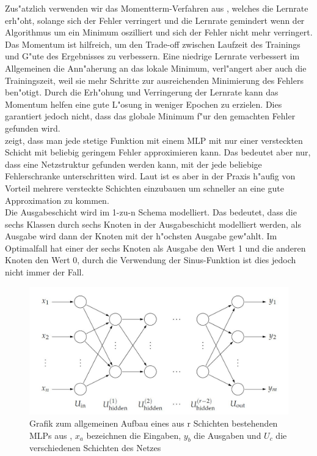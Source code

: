 Zus"atzlich verwenden wir das Momentterm-Verfahren aus \cite{rumelhart1988learning}, welches die Lernrate erh"oht, solange sich der Fehler verringert und die Lernrate gemindert wenn der Algorithmus um ein Minimum oszilliert und sich der Fehler nicht mehr verringert. Das Momentum ist hilfreich, um den Trade-off zwischen Laufzeit des Trainings und G"ute des Ergebnisses zu verbessern. Eine niedrige Lernrate verbessert im Allgemeinen die Ann"aherung an das lokale Minimum, verl"angert aber auch die Trainingszeit, weil sie mehr Schritte zur ausreichenden Minimierung des Fehlers ben"otigt. Durch die Erh"ohung und Verringerung der Lernrate kann das Momentum helfen eine gute L"osung in weniger Epochen zu erzielen. Dies garantiert jedoch nicht, dass das globale Minimum f"ur den gemachten Fehler gefunden wird. \\
\cite{pinkus1999approximation} zeigt, dass man jede stetige Funktion mit einem MLP mit nur einer versteckten Schicht mit beliebig geringem Fehler approximieren kann. Das bedeutet aber nur, dass eine Netzstruktur gefunden werden kann, mit der jede beliebige Fehlerschranke unterschritten wird. Laut \cite{kruse2011computational} ist es aber in der Praxis h"aufig von Vorteil mehrere versteckte Schichten einzubauen um schneller an eine gute Approximation zu kommen. \\
Die Ausgabeschicht wird im 1-zu-n Schema modelliert. Das bedeutet, dass die sechs Klassen durch sechs Knoten in der Ausgabeschicht modelliert werden, als Ausgabe wird dann der Knoten mit der h"ochsten Ausgabe gew"ahlt. Im Optimalfall hat einer der sechs Knoten als Ausgabe den Wert 1 und die anderen Knoten den Wert 0, durch die Verwendung der Sinus-Funktion ist dies jedoch nicht immer der Fall. 

\begin{figure}[h]
\includegraphics[width=\textwidth]{1_Grafiken/fig1kruse.jpg}
	\caption[Allgemeiner Aufbau eines mehrschichtigen Perzeptrons]{Grafik zum allgemeinen Aufbau eines aus r Schichten bestehenden MLPs aus \cite{kruse2011computational}, $x_a$ bezeichnen die Eingaben, $y_b$ die Ausgaben und $U_c$ die verschiedenen Schichten des Netzes}
\label{mlp}
\end{figure}

